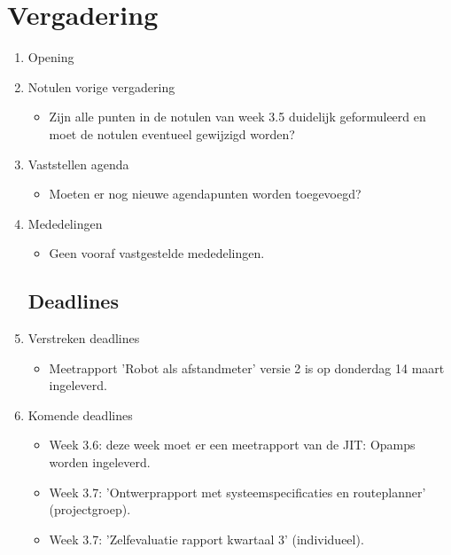 \documentclass{article}
\begin{document}
\section*{Vergadering}
\begin{enumerate}
	
\subsection*{Vooraf}
\item Opening
\item Notulen vorige vergadering
\begin{itemize}
\item Zijn alle punten in de notulen van week 3.5 duidelijk geformuleerd en moet de notulen eventueel gewijzigd worden?
\end{itemize}
\item Vaststellen agenda
\begin{itemize}
\item Moeten er nog nieuwe agendapunten worden toegevoegd?
\end{itemize}

\item Mededelingen
\begin{itemize}
\item Geen vooraf vastgestelde mededelingen.
\end{itemize}

\subsection*{Deadlines}
\item Verstreken deadlines
\begin{itemize}
\item Meetrapport 'Robot als afstandmeter' versie 2 is op donderdag 14 maart ingeleverd.
\end{itemize}
\item Komende deadlines
\begin{itemize}
\item Week 3.6: deze week moet er een meetrapport van de JIT: Opamps worden ingeleverd. 
\item Week 3.7: 'Ontwerprapport met systeemspecificaties en routeplanner' (projectgroep).
\item Week 3.7: 'Zelfevaluatie rapport kwartaal 3' (individueel).
\end{itemize}


\end{enumerate}
\end{document}
